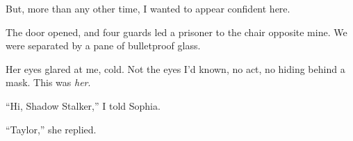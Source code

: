 But, more than any other time, I wanted to appear confident here.



The door opened, and four guards led a prisoner to the chair opposite mine.  We were separated by a pane of bulletproof glass.



Her eyes glared at me, cold.  Not the eyes I'd known, no act, no hiding behind a mask.  This was \emph{her}.



``Hi, Shadow Stalker,'' I told Sophia.



``Taylor,'' she replied.





